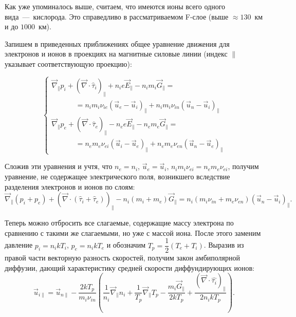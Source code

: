 \documentclass[14pt, a4paper]{extarticle}
\begin{document}
Как уже упоминалось выше, считаем, что имеются ионы всего одного вида~---~кислорода. Это справедливо в рассматриваемом F-слое (выше $\approx 130$~км и до $1000$~км).

Запишем в приведенных приближениях общее уравнение движения для электронов и ионов в проекциях на магнитные силовые линии (индекс $\parallel$ указывает соответствующую проекцию):

\begin{equation}
\begin{cases}
\vec{\nabla}_\parallel p_i + (\vec{\nabla}\cdot \hat{\tau}_i)_\parallel + n_ie\vec{E}_\parallel-n_im_i\vec{G}_\parallel=\\
\textrm{ }\textrm{ }\textrm{ }\textrm{ }\textrm{ }=n_im_i\nu_{ie}(\vec{u}_e-\vec{u}_i)_\parallel+n_im_i\nu_{in}(\vec{u}_n-\vec{u}_i)_\parallel\\
\vec{\nabla}_\parallel p_e + (\vec{\nabla}\cdot \hat{\tau}_e)_\parallel - n_ee\vec{E}_\parallel-n_em_e\vec{G}_\parallel=\\
\textrm{ }\textrm{ }\textrm{ }\textrm{ }\textrm{ }=n_em_e\nu_{ei}(\vec{u}_i-\vec{u}_e)_\parallel+n_em_e\nu_{en}(\vec{u}_n-\vec{u}_e)_\parallel
\end{cases} 
\end{equation}

Сложив эти уравнения и учтя, что $n_e=n_i$, $\vec{u}_e=\vec{u}_i$, $n_im_i\nu_{ei}=n_em_e\nu_{ei}$, получим уравнение, не содержащее электрического поля, возникшего вследствие разделения электронов и ионов по слоям:
\begin{equation}
\vec{\nabla}_\parallel (p_i+p_e) + (\vec{\nabla}\cdot (\hat{\tau}_i+\hat{\tau}_e))_\parallel-n_i(m_i+m_e)\vec{G}_\parallel=n_i(m_i\nu_{in}+m_e\nu_{en})(\vec{u}_n-\vec{u}_i)_\parallel.
\end{equation}

Теперь можно отбросить все слагаемые, содержащие массу электрона по сравнению с такими же слагаемыми, но уже с массой иона. После этого заменим давление $p_i=n_ikT_i$, $p_e=n_ikT_e$ и обозначим $T_p=\dfrac{1}{2}(T_e+T_i)$. Выразив из правой части векторную разность скоростей, получим закон амбиполярной диффузии, дающий характеристику средней скорости диффундирующих ионов: 
\begin{equation}
\vec{u}_{i\parallel} = \vec{u}_{n\parallel} - \dfrac{2kT_p}{m_i\nu_{in}}\left(\dfrac{1}{n_i}\vec{\nabla}_\parallel n_i+\dfrac{1}{T_p}\vec{\nabla}_\parallel T_p-\dfrac{m_i\vec{G}_\parallel}{2kT_p}+\dfrac{(\vec{\nabla}\cdot\hat{\tau_i})_\parallel}{2n_ikT_p}\right).
\end{equation}
\end{document}
